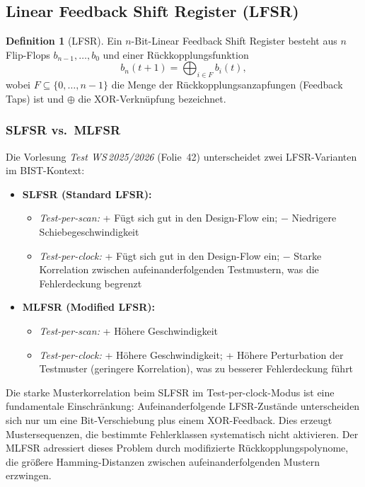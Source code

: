 ﻿\documentclass[a4paper,12pt]{article}
\theoremstyle{definition}
\newtheorem{definition}{Definition}
\begin{document}
\subsection{Linear Feedback Shift Register (LFSR)}

\begin{definition}[LFSR]
  Ein $n$-Bit-Linear Feedback Shift Register besteht aus $n$ Flip-Flops
  $b_{n-1}, \ldots, b_0$ und einer Rückkopplungsfunktion
  \[
    b_n(t+1) = \bigoplus_{i \in F} b_i(t),
  \]
  wobei $F \subseteq \{0, \ldots, n-1\}$ die Menge der
  Rückkopplungs\-anzapfungen (Feedback Taps) ist und $\oplus$ die
  XOR-Verknüpfung bezeichnet.
\end{definition}

\subsubsection{SLFSR vs.\ MLFSR}

Die Vorlesung \emph{Test WS\,2025/2026} (Folie~42) unterscheidet zwei
LFSR-Varianten im BIST-Kontext:

\begin{itemize}
  \item \textbf{SLFSR (Standard LFSR):}
    \begin{itemize}
      \item \emph{Test-per-scan:} + Fügt sich gut in den Design-Flow ein;
            $-$ Niedrigere Schiebegeschwindigkeit
      \item \emph{Test-per-clock:} + Fügt sich gut in den Design-Flow ein;
            $-$ Starke Korrelation zwischen aufeinanderfolgenden
            Testmustern, was die Fehlerdeckung begrenzt
    \end{itemize}
  \item \textbf{MLFSR (Modified LFSR):}
    \begin{itemize}
      \item \emph{Test-per-scan:} + Höhere Geschwindigkeit
      \item \emph{Test-per-clock:} + Höhere Geschwindigkeit;
            + Höhere Perturbation der Testmuster (geringere Korrelation),
            was zu besserer Fehlerdeckung führt
    \end{itemize}
\end{itemize}

Die starke Musterkorrelation beim SLFSR im Test-per-clock-Modus ist eine
fundamentale Einschränkung: Aufeinanderfolgende LFSR-Zustände unterscheiden
sich nur um eine Bit-Verschiebung plus einem XOR-Feedback. Dies erzeugt
Mustersequenzen, die bestimmte Fehlerklassen systematisch nicht aktivieren.
Der MLFSR adressiert dieses Problem durch modifizierte Rückkopplungspolynome,
die größere Hamming-Distanzen zwischen aufeinanderfolgenden Mustern erzwingen.
\end{document}

